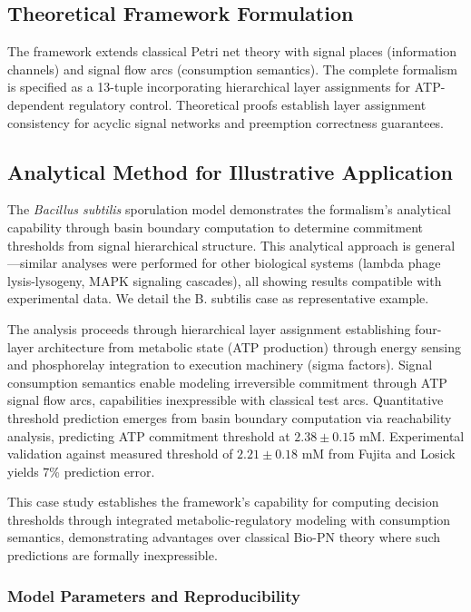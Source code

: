 \documentclass[10pt,letterpaper]{article}
\begin{document}
\subsection{Theoretical Framework Formulation}

The framework extends classical Petri net theory with signal places (information channels) and signal flow arcs (consumption semantics). The complete formalism is specified as a 13-tuple incorporating hierarchical layer assignments for ATP-dependent regulatory control. Theoretical proofs establish layer assignment consistency for acyclic signal networks and preemption correctness guarantees.

\subsection{Analytical Method for Illustrative Application}

The \textit{Bacillus subtilis} sporulation model demonstrates the formalism's analytical capability through basin boundary computation to determine commitment thresholds from signal hierarchical structure. This analytical approach is general---similar analyses were performed for other biological systems (lambda phage lysis-lysogeny, MAPK signaling cascades), all showing results compatible with experimental data. We detail the B. subtilis case as representative example.

\vspace{3pt}
\noindent The analysis proceeds through hierarchical layer assignment establishing four-layer architecture from metabolic state (ATP production) through energy sensing and phosphorelay integration to execution machinery (sigma factors). Signal consumption semantics enable modeling irreversible commitment through ATP signal flow arcs, capabilities inexpressible with classical test arcs. Quantitative threshold prediction emerges from basin boundary computation via reachability analysis, predicting ATP commitment threshold at $2.38 \pm 0.15$ mM. Experimental validation against measured threshold of $2.21 \pm 0.18$ mM from Fujita and Losick yields 7\% prediction error.

This case study establishes the framework's capability for computing decision thresholds through integrated metabolic-regulatory modeling with consumption semantics, demonstrating advantages over classical Bio-PN theory where such predictions are formally inexpressible.

\subsubsection{Model Parameters and Reproducibility}
\end{document}
